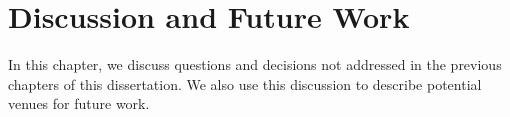 \setcounter{chapter}{6}


\chapter{Discussion and Future Work}
\label{ch:discussion}


In this chapter, we discuss questions
and decisions not addressed in the previous chapters of this dissertation. 
We also use this discussion to describe potential venues for future work.




 











% 
% 
